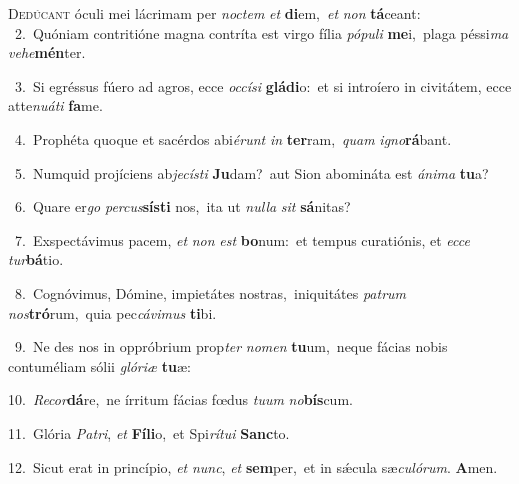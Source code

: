 \lettrine{\initial\textcolor{\initialcolor}{D}}{edúcant} óculi mei lácrimam per \textit{noc}\-\textit{tem} \textit{et} \textbf{di}\-em,~\star \textit{et} \textit{non} \textbf{tá}\-ceant:\\
{\numbfont\textcolor{\numbcolor}{~2.}}~Quóniam contritióne magna contríta est virgo fília \textit{pó}\-\textit{pu}\textit{li} \textbf{me}\-i,~\star plaga péssi\textit{ma} \textit{ve}\-\textit{he}\textbf{mén}ter.\par
{\numbfont\textcolor{\numbcolor}{~3.}}~Si egréssus fúero ad agros, ecce \textit{oc}\-\textit{cí}\textit{si} \textbf{glá}\-\textbf{di}o:~\star et si introíero in civitátem, ecce atte\-\textit{nu}\-\textit{á}\textit{ti} \textbf{fa}\-me.\par
{\numbfont\textcolor{\numbcolor}{~4.}}~Prophéta quoque et sacérdos abi\-\textit{é}\-\textit{runt} \textit{in} \textbf{ter}\-ram,~\star \textit{quam} \textit{i}\-\textit{gno}\textbf{rá}bant.\par
{\numbfont\textcolor{\numbcolor}{~5.}}~Numquid projíciens ab\-\textit{je}\-\textit{cís}\textit{ti} \textbf{Ju}\-dam?~\star aut Sion abomináta est \textit{á}\-\textit{ni}\textit{ma} \textbf{tu}\-a?\par
{\numbfont\textcolor{\numbcolor}{~6.}}~Quare er\textit{go} \textit{per}\-\textit{cus}\textbf{sís}\textbf{ti} nos,~\star ita ut \textit{nul}\-\textit{la} \textit{sit} \textbf{sá}\-nitas?\par
{\numbfont\textcolor{\numbcolor}{~7.}}~Exspectávimus pacem, \textit{et} \textit{non} \textit{est} \textbf{bo}\-num:~\star et tempus curatiónis, et \textit{ec}\-\textit{ce} \textit{tur}\-\textbf{bá}tio.\par
{\numbfont\textcolor{\numbcolor}{~8.}}~Cognóvimus, Dómine, impietátes nostras,~\dagger iniquitátes \textit{pa}\-\textit{trum} \textit{nos}\-\textbf{tró}rum,~\star quia pec\-\textit{cá}\-\textit{vi}\textit{mus} \textbf{ti}\-bi.\par
{\numbfont\textcolor{\numbcolor}{~9.}}~Ne des nos in oppróbrium prop\textit{ter} \textit{no}\-\textit{men} \textbf{tu}\-um,~\star neque fácias nobis contuméliam sólii \textit{gló}\-\textit{ri}\textit{æ} \textbf{tu}\-æ:\par
{\numbfont\textcolor{\numbcolor}{10.}}~\-\textit{Re}\-\textit{cor}\textbf{dá}re,~\star ne írritum fácias fœdus \textit{tu}\-\textit{um} \textit{no}\-\textbf{bís}cum.\par
{\numbfont\textcolor{\numbcolor}{11.}}~Glória \textit{Pa}\-\textit{tri}, \textit{et} \textbf{Fí}\-\textbf{li}o,~\star et Spi\-\textit{rí}\-\textit{tu}\textit{i} \textbf{Sanc}\-to.\par
{\numbfont\textcolor{\numbcolor}{12.}}~Sicut erat in princípio, \textit{et} \textit{nunc}\-, \textit{et} \textbf{sem}\-per,~\star et in sǽcula sæ\-\textit{cu}\-\textit{ló}\textit{rum}. \textbf{A}\-men.\par
